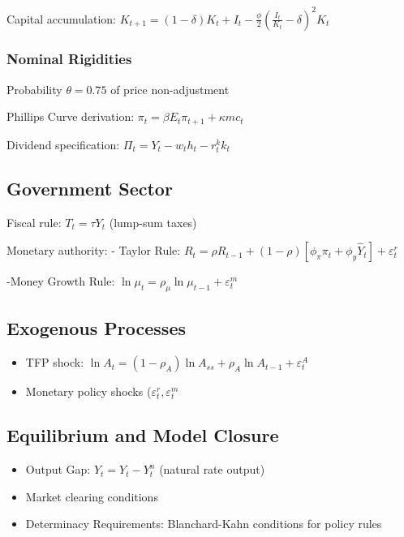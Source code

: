 \documentclass[11pt,preprint]{elsarticle}
\numberwithin{equation}{section}
\numberwithin{figure}{section}
\numberwithin{table}{section}
\begin{document}
Capital accumulation:
\(K_{t+1} = (1-\delta)K_t + I_t - \frac{\phi}{2}\left(\frac{I_t}{K_t} - \delta\right)^2 K_t\)

\subsubsection{Nominal Rigidities}\label{nominal-rigidities}

Probability \(\theta=0.75\) of price non-adjustment

Phillips Curve derivation: \(\pi_t = \beta E_t\pi_{t+1} + \kappa mc_t\)

Dividend specification: \(\Pi_t = Y_t - w_t h_t - r_t^k k_t\)

\subsection{Government Sector}\label{government-sector}

Fiscal rule: \(T_t = \tau Y_t\) (lump-sum taxes)

Monetary authority: - Taylor Rule:
\(R_t = \rho R_{t-1} + (1-\rho)[\phi_\pi \pi_t + \phi_y \hat{Y}_t] + \varepsilon_t^r\)

-Money Growth Rule:
\(\ln \mu_t = \rho_\mu \ln \mu_{t-1} + \varepsilon_t^m\)

\subsection{Exogenous Processes}\label{exogenous-processes}

\begin{itemize}
\item
  TFP shock:
  \(\ln A_t = (1-\rho_A)\ln A_{ss} + \rho_A \ln A_{t-1} + \varepsilon_t^A\)
\item
  Monetary policy shocks (\(\varepsilon_t^r, \varepsilon_t^m\)
\end{itemize}

\subsection{Equilibrium and Model
Closure}\label{equilibrium-and-model-closure}

\begin{itemize}
\item
  Output Gap: \(\hat{Y}_t = Y_t - Y_t^n\) (natural rate output)
\item
  Market clearing conditions
\item
  Determinacy Requirements: Blanchard-Kahn conditions for policy rules
\end{itemize}
\end{document}
